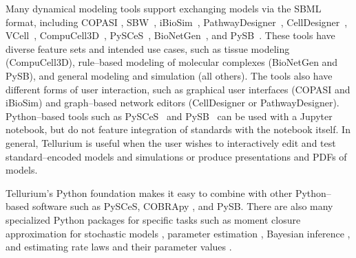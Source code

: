 \documentclass[10pt,letterpaper]{article}
\begin{document}
Many dynamical modeling tools support exchanging models via the SBML format, including COPASI \cite{hoops2006copasi,mendes2009computational}, SBW~\cite{bergmann2006sbw}, iBioSim~\cite{myers2009ibiosim}, PathwayDesigner~\cite{pathwaydesigner}, CellDesigner~\cite{Funahashi2008,Funahashi2003159}, VCell~\cite{moraru2008virtual,schaff2016rule}, CompuCell3D~\cite{swat2012multi}, PySCeS~\cite{olivier2005modelling}, BioNetGen~\cite{blinov2004bionetgen}, and PySB~\cite{lopez2013programming}. These tools have diverse feature sets and intended use cases, such as tissue modeling (CompuCell3D), rule--based modeling of molecular complexes (BioNetGen and PySB), and general modeling and simulation (all others). The tools also have different forms of user interaction, such as graphical user interfaces (COPASI and iBioSim) and graph--based network editors (CellDesigner or PathwayDesigner). Python--based tools such as PySCeS~\cite{olivier2005modelling} and PySB~\cite{lopez2013programming} can be used with a Jupyter notebook, but do not feature integration of standards with the notebook itself. In general, Tellurium is useful when the user wishes to interactively edit and test standard--encoded models and simulations or produce presentations and PDFs of models. %


Tellurium's Python foundation makes it easy to combine with other Python--based software such as PySCeS, COBRApy \cite{ebrahim2013cobrapy}, and PySB. There are also many specialized Python packages for specific tasks such as moment closure approximation for stochastic models \cite{fan2016means}, parameter estimation \cite{Swaminathan121152}, Bayesian inference \cite{liepe2010abc}, and estimating rate laws and their parameter values \cite{Theisen065177}. %
\end{document}
